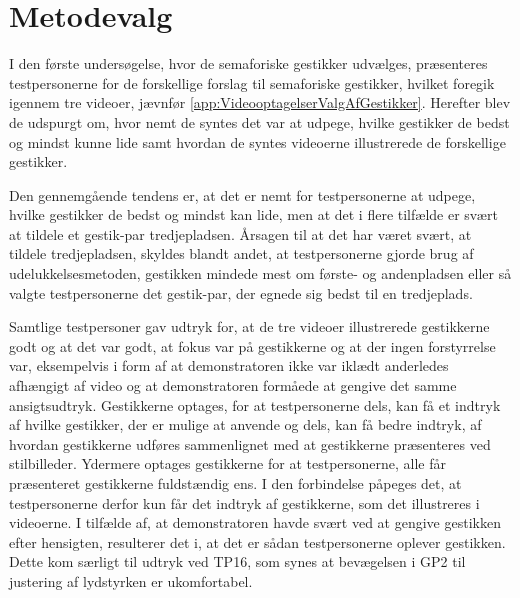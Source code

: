 \section{Metodevalg}
\label{DiskussionMetodevalg}
%
I den første undersøgelse, hvor de semaforiske gestikker udvælges, præsenteres testpersonerne for de forskellige forslag til semaforiske gestikker, hvilket foregik igennem tre videoer, jævnfør \autoref{app:VideooptagelserValgAfGestikker}. Herefter blev de udspurgt om, hvor nemt de syntes det var at udpege, hvilke gestikker de bedst og mindst kunne lide samt hvordan de syntes videoerne illustrerede de forskellige gestikker.

Den gennemgående tendens er, at det er nemt for testpersonerne at udpege, hvilke gestikker de bedst og mindst kan lide, men at det i flere tilfælde er svært at tildele et gestik-par tredjepladsen. Årsagen til at det har været svært, at tildele tredjepladsen, skyldes blandt andet, at testpersonerne gjorde brug af udelukkelsesmetoden, gestikken mindede mest om første- og andenpladsen eller så valgte testpersonerne det gestik-par, der egnede sig bedst til en tredjeplads. 

Samtlige testpersoner gav udtryk for, at de tre videoer illustrerede gestikkerne godt og at det var godt, at fokus var på gestikkerne og at der ingen forstyrrelse var, eksempelvis i form af at demonstratoren ikke var iklædt anderledes afhængigt af video og at demonstratoren formåede at gengive det samme ansigtsudtryk. Gestikkerne optages, for at testpersonerne dels, kan få et indtryk af hvilke gestikker, der er mulige at anvende og dels, kan få bedre indtryk, af hvordan gestikkerne udføres sammenlignet med at gestikkerne præsenteres ved stilbilleder. Ydermere optages gestikkerne for at testpersonerne, alle får præsenteret gestikkerne fuldstændig ens. I den forbindelse påpeges det, at testpersonerne derfor kun får det indtryk af gestikkerne, som det illustreres i videoerne. I tilfælde af, at demonstratoren havde svært ved at gengive gestikken efter hensigten, resulterer det i, at det er sådan testpersonerne oplever gestikken. Dette kom særligt til udtryk ved TP16, som synes at bevægelsen i GP2 til justering af lydstyrken er ukomfortabel. 

